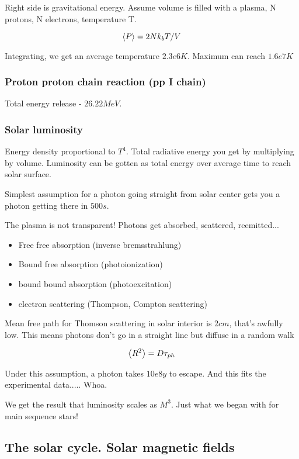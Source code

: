 \documentclass[PlasmaNotes.tex]{subfiles}
\begin{document}
Right side is gravitational energy. Assume volume is filled with a plasma, N protons, N electrons, temperature T.

\[ \left< P \right> = 2 N k_b T/V \]

Integrating, we get an average temperature $2.3e6 K$. Maximum can reach $1.6e7 K$

\subsubsection{Proton proton chain reaction (pp I chain)}

Total energy release - $26.22 MeV$.

\subsubsection{Solar luminosity}

Energy density proportional to $T^4$. Total radiative energy you get by multiplying by volume. Luminosity can be gotten as total energy over average time to reach solar surface.

Simplest assumption for a photon going straight from solar center gets you a photon getting there in $500s$.

The plasma is not transparent! Photons get absorbed, scattered, reemitted...

\begin{itemize}
\item Free free absorption (inverse bremsstrahlung)
\item Bound free absorption (photoionization)
\item bound bound absorption (photoexcitation)
\item electron scattering (Thompson, Compton scattering)
\end{itemize}

Mean free path for Thomson scattering in solar interior is $2 cm$, that's awfully low. This means photons don't go in a straight line but diffuse in a random walk

\[ \left< R^2 \right> = D \tau_{ph} \]

Under this assumption, a photon takes $10e8 y$ to escape. And this fits the experimental data..... Whoa.

We get the result that luminosity scales as $M^3$. Just what we began with for main sequence stars!


\subsection{The solar cycle. Solar magnetic fields}
\end{document}
